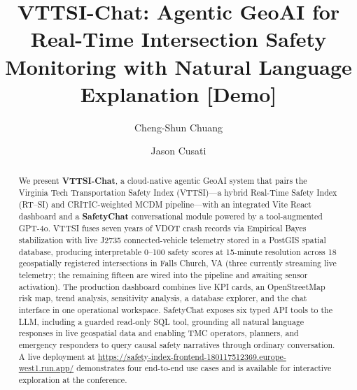 \documentclass[sigconf]{acmart}
\begin{document}
\title[VTTSI-Chat]{VTTSI-Chat: Agentic GeoAI for Real-Time Intersection
  Safety Monitoring with Natural Language Explanation [Demo]}

\author{Cheng-Shun Chuang}

\author{Jason Cusati}

\renewcommand{\shortauthors}{Chuang and Cusati}

\begin{abstract}
We present \textbf{VTTSI-Chat}, a cloud-native agentic GeoAI system that
pairs the Virginia Tech Transportation Safety Index (VTTSI)---a hybrid
Real-Time Safety Index (RT--SI) and CRITIC-weighted MCDM pipeline---with an
integrated Vite React dashboard and a \textbf{SafetyChat} conversational
module powered by a tool-augmented GPT-4o.
VTTSI fuses seven years of VDOT crash records via Empirical Bayes
stabilization with live J2735 connected-vehicle telemetry stored in a
PostGIS spatial database, producing interpretable 0--100 safety scores at
15-minute resolution across 18 geospatially registered intersections in
Falls Church, VA (three currently streaming live telemetry; the remaining
fifteen are wired into the pipeline and awaiting sensor activation).
The production dashboard combines live KPI cards, an OpenStreetMap risk map,
trend analysis, sensitivity analysis, a database explorer, and the chat
interface in one operational workspace.
SafetyChat exposes six typed API tools to the LLM, including a guarded
read-only SQL tool, grounding all natural language responses in live
geospatial data and enabling TMC operators, planners, and emergency
responders to query causal safety narratives through ordinary conversation.
A live deployment at
\url{https://safety-index-frontend-180117512369.europe-west1.run.app/}
demonstrates four end-to-end use cases and is available for interactive
exploration at the conference.
\end{abstract}
\end{document}
